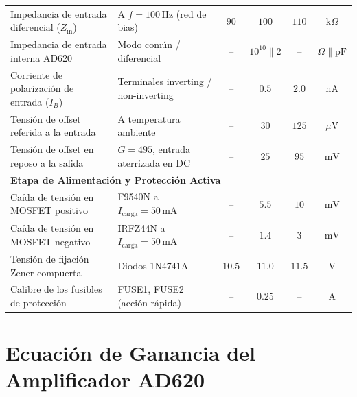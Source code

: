 \documentclass[10pt,a4paper]{article}
\begin{document}
\begin{table}[H]
{\begin{tabular}{llcccc}
        Impedancia de entrada diferencial ($Z_{\text{in}}$) & A $f = 100\,\text{Hz}$ (red de bias) & $90$ & $100$ & $110$ & $\text{k}\Omega$ \\
        Impedancia de entrada interna AD620 & Modo común / diferencial & -- & $10^{10} \parallel 2$ & -- & $\Omega \parallel \text{pF}$ \\
        Corriente de polarización de entrada ($I_B$) & Terminales inverting / non-inverting & -- & $0.5$ & $2.0$ & $\text{nA}$ \\
        Tensión de offset referida a la entrada & A temperatura ambiente & -- & $30$ & $125$ & $\mu\text{V}$ \\
        Tensión de offset en reposo a la salida & $G = 495$, entrada aterrizada en DC & -- & $25$ & $95$ & $\text{mV}$ \\
        \midrule
        \multicolumn{6}{l}{\textbf{Etapa de Alimentación y Protección Activa}} \\
        Caída de tensión en MOSFET positivo & F9540N a $I_{\text{carga}} = 50\,\text{mA}$ & -- & $5.5$ & $10$ & $\text{mV}$ \\
        Caída de tensión en MOSFET negativo & IRFZ44N a $I_{\text{carga}} = 50\,\text{mA}$ & -- & $1.4$ & $3$ & $\text{mV}$ \\
        Tensión de fijación Zener compuerta & Diodos 1N4741A & $10.5$ & $11.0$ & $11.5$ & $\text{V}$ \\
        Calibre de los fusibles de protección & FUSE1, FUSE2 (acción rápida) & -- & $0.25$ & -- & $\text{A}$ \\
        \bottomrule
    \end{tabular}%
    }
\end{table}

\clearpage

\section{Ecuación de Ganancia del Amplificador AD620}
\end{document}

